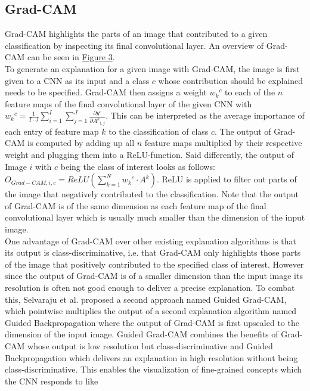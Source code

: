 \documentclass{article}
\begin{document}
\subsection{Grad-CAM}
Grad-CAM highlights the parts of an image that contributed to a given classification by inspecting its
final convolutional layer. An overview of Grad-CAM can be seen in \hyperref[fig:gradcam]{Figure 3}. \\
To generate an explanation for a given image with Grad-CAM, the image is first given to a CNN as its input
and a class $c$ whose contribution should be explained needs to be specified. Grad-CAM then assigns a weight
${w_k}^c$ to each of the $n$ feature maps of the final convolutional layer of the given CNN with
${w_k}^c = \frac{1}{I \cdot J} \sum\limits_{i=1}^{I} \sum\limits_{j=1}^J \frac{\partial y^c}{\partial {A^k}_{i,j}}$.
This can be interpreted as the average importance of each entry of feature map $k$ to the classification of class $c$.
The output of Grad-CAM is computed by adding up all $n$ feature maps multiplied by their respective weight and plugging
them into a ReLU-function. Said differently, the output of Image $i$ with $c$ being the class of interest looks as follows:
$O_{Grad-CAM, i, c} = ReLU(\sum\limits_{k=1}^N {w_k}^c \cdot A^k)$. ReLU is applied to filter out parts of the image that
negatively contributed to the classification. Note that the output of Grad-CAM is of the same dimension as each
feature map of the final convolutional layer which is usually much smaller than the dimension of the input image. \\
One advantage of Grad-CAM over other existing explanation algorithms is that its output is class-discriminative,
i.e. that Grad-CAM only highlights those parts of the image that positively contributed to the specified class of interest.
However since the output of Grad-CAM is of a smaller dimension than the input image its resolution is often not good enough
to deliver a precise explanation. To combat this, Selvaraju et al. proposed a second approach named Guided Grad-CAM,
which pointwise multiplies the output of a second explanation algorithm named Guided Backpropagation \cite{springenberg2015striving}
where the output of Grad-CAM is first upscaled to the dimension of the input image. 
Guided Grad-CAM combines the benefits of Grad-CAM whose output is low resolution but class-discriminative and
Guided Backpropagation which delivers an explanation in high resolution without being class-discriminative.
This enables the visualization of fine-grained concepts which the CNN responds to like
\end{document}
